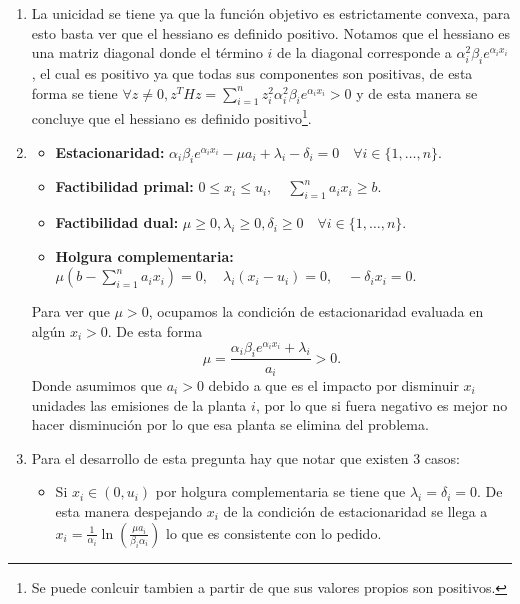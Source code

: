 \begin{enumerate}
  \item[(a)] La unicidad se tiene ya que la función objetivo es estrictamente convexa, para esto basta ver que el hessiano es definido positivo. Notamos que el hessiano es una matriz diagonal donde el término $i$ de la diagonal corresponde a $\alpha_i^2 \beta_i e^{\alpha_i x_i}$, el cual es positivo ya que todas sus componentes son positivas, de esta forma se tiene $\forall z \neq 0, z^T H z = \sum_{i=1}^{n} z_i^2 \alpha_i^2 \beta_i e^{\alpha_i x_i} > 0$ y de esta manera se concluye que el hessiano es definido positivo\footnote{Se puede conlcuir tambien a partir de que sus valores propios son positivos.}.
  \item[(b)] \begin{itemize}
    \item \textbf{Estacionaridad:} $\alpha_i \beta_i e^{\alpha_i x_i} - \mu a_i + \lambda_i - \delta_i = 0 \quad \forall i \in \{1, \ldots, n\}$.
    \item \textbf{Factibilidad primal:} $0 \leq x_i \leq u_i, \quad \sum_{i=1}^{n} a_i x_i \geq b$.
    \item \textbf{Factibilidad dual:} $\mu \geq 0, \lambda_i \geq 0, \delta_i \geq 0 \quad \forall i \in \{1, \ldots, n\}$.
    \item \textbf{Holgura complementaria:} $\mu (b - \sum_{i=1}^{n} a_i x_i) = 0, \quad \lambda_i (x_i - u_i) = 0, \quad -\delta_i x_i = 0$.
\end{itemize}

Para ver que $\mu > 0$, ocupamos la condición de estacionaridad evaluada en algún $x_i > 0$. De esta forma 
\[
\mu = \frac{\alpha_i \beta_i e^{\alpha_i x_i} + \lambda_i}{a_i} > 0.
\]
Donde asumimos que $a_i > 0$ debido a que es el impacto por disminuir $x_i$ unidades las emisiones de la planta $i$, por lo que si fuera negativo es mejor no hacer disminución por lo que esa planta se elimina del problema.
  \item[(c)] Para el desarrollo de esta pregunta hay que notar que existen 3 casos:

\begin{itemize}
    \item Si $x_i \in (0, u_i)$ por holgura complementaria se tiene que $\lambda_i = \delta_i = 0$. De esta manera despejando $x_i$ de la condición de estacionaridad se llega a $x_i = \frac{1}{\alpha_i} \ln \left( \frac{\mu a_i}{\beta_i \alpha_i} \right)$ lo que es consistente con lo pedido.


\end{itemize}
\end{enumerate}
